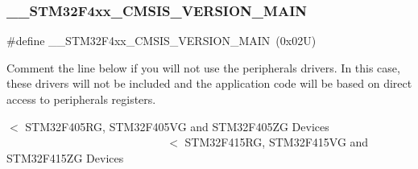 \subsubsection{\texorpdfstring{\+\_\+\+\_\+\+S\+T\+M32\+F4xx\+\_\+\+C\+M\+S\+I\+S\+\_\+\+V\+E\+R\+S\+I\+O\+N\+\_\+\+M\+A\+IN}{\_\_STM32F4xx\_CMSIS\_VERSION\_MAIN}}
{\footnotesize\ttfamily \#define \+\_\+\+\_\+\+S\+T\+M32\+F4xx\+\_\+\+C\+M\+S\+I\+S\+\_\+\+V\+E\+R\+S\+I\+O\+N\+\_\+\+M\+A\+IN~(0x02\+U)}



Comment the line below if you will not use the peripherals drivers. In this case, these drivers will not be included and the application code will be based on direct access to peripherals registers. 

$<$ S\+T\+M32\+F405\+RG, S\+T\+M32\+F405\+VG and S\+T\+M32\+F405\+ZG Devices ~\newline
~\newline
~\newline
~\newline
~\newline
~\newline
~\newline
~\newline
~\newline
~\newline
~\newline
~\newline
~\newline
~\newline
~\newline
~\newline
~\newline
~\newline
~\newline
~\newline
~\newline
~\newline
~\newline
~\newline
~\newline
 $<$ S\+T\+M32\+F415\+RG, S\+T\+M32\+F415\+VG and S\+T\+M32\+F415\+ZG Devices ~\newline
~\newline
~\newline
~\newline
~\newline
~\newline
~\newline
~\newline
~\newline
